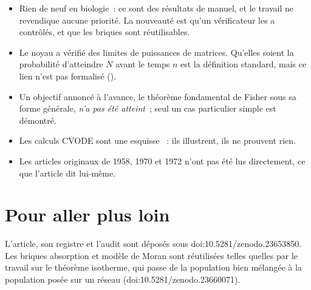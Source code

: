 \begin{limite}
\begin{itemize}
\item Rien de neuf en biologie~: ce sont des résultats de manuel, et le travail ne revendique aucune priorité. La
  nouveauté est qu'un vérificateur les a contrôlés, et que les briques sont réutilisables.
\item Le noyau a vérifié des limites de puissances de matrices. Qu'elles soient \og la probabilité d'atteindre $N$
  avant le temps $n$\fg{} est la définition standard, mais ce lien n'est pas formalisé ().
\item Un objectif annoncé à l'avance, le théorème fondamental de Fisher sous sa forme générale, \emph{n'a pas été
  atteint}~; seul un cas particulier simple est démontré.
\item Les calculs CVODE sont une esquisse ~: ils illustrent, ils ne prouvent rien.
\item Les articles originaux de 1958, 1970 et 1972 n'ont pas été lus directement, ce que l'article dit lui-même.
\end{itemize}
\end{limite}

\section*{Pour aller plus loin}

L'article, son registre et l'audit sont déposés sous doi:10.5281/\allowbreak zenodo.23653850. Les briques \og absorption\fg{}
et \og modèle de Moran\fg{} sont réutilisées telles quelles par le travail sur le théorème isotherme, qui passe de la
population bien mélangée à la population posée sur un réseau (doi:10.5281/zenodo.23660071).
